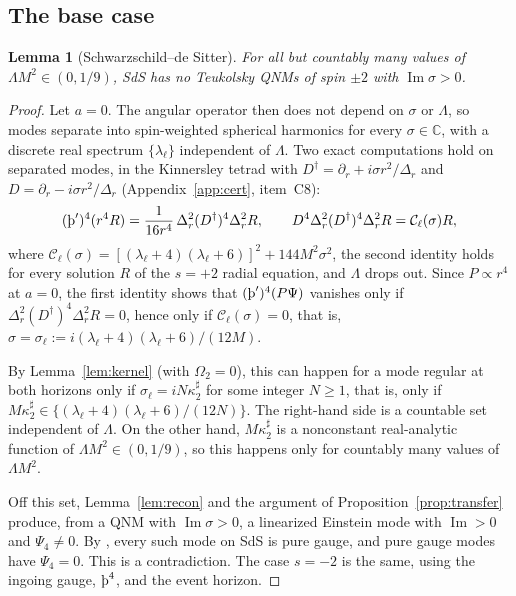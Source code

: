 \documentclass[11pt]{amsart}
\newtheorem{lemma}[theorem]{Lemma}
\theoremstyle{definition}
\theoremstyle{remark}
\numberwithin{equation}{section}
\newcommand{\Th}{\text{\th}}
\newcommand{\C}{\mathbb{C}}
\renewcommand{\Im}{\operatorname{Im}}
\begin{document}
\subsection{The base case}
\begin{lemma}[Schwarzschild--de Sitter]\label{lem:sds}
For all but countably many values of $\Lambda M^2\in(0,1/9)$, SdS has no Teukolsky QNMs of spin $\pm2$ with
$\Im\sigma>0$.
\end{lemma}

\begin{proof}
Let $a=0$. The angular operator then does not depend on $\sigma$ or $\Lambda$, so modes separate into spin-weighted
spherical harmonics for every $\sigma\in\C$, with a discrete real spectrum $\{\lambda_\ell\}$ independent of $\Lambda$. Two
exact computations hold on separated modes, in the Kinnersley tetrad with $D^\dagger=\partial_r+i\sigma r^2/\Delta_r$
and $D=\partial_r-i\sigma r^2/\Delta_r$ (Appendix~\ref{app:cert}, item~C8):
\begin{equation}\label{eq:sdsTS}
(\Th')^4(r^4R)=\frac{1}{16r^4}\,\Delta_r^2(D^\dagger)^4\Delta_r^2R,\qquad
D^4\Delta_r^2(D^\dagger)^4\Delta_r^2R=\mathcal C_\ell(\sigma)R,
\end{equation}
where $\mathcal C_\ell(\sigma)=[(\lambda_\ell+4)(\lambda_\ell+6)]^2+144M^2\sigma^2$, the second identity holds for every solution
$R$ of the $s=+2$ radial equation, and $\Lambda$ drops out. Since $P\propto r^4$ at $a=0$, the first identity shows
that $(\Th')^4(P\Psi)$ vanishes only if $\Delta_r^2(D^\dagger)^4\Delta_r^2R=0$, hence only if $\mathcal C_\ell(\sigma)=0$, that is,
$\sigma=\sigma_\ell:=i(\lambda_\ell+4)(\lambda_\ell+6)/(12M)$.

By Lemma~\ref{lem:kernel} (with $\Omega_2=0$), this can happen for a mode regular at both horizons only if
$\sigma_\ell=iN\kappa_2^\sharp$ for some integer $N\ge1$, that is, only if $M\kappa_2^\sharp\in\{(\lambda_\ell+4)(\lambda_\ell+6)/(12N)\}$.
The right-hand side is a countable set independent of $\Lambda$. On the other hand, $M\kappa_2^\sharp$ is a nonconstant real-analytic function of
$\Lambda M^2\in(0,1/9)$, so this happens only for countably many values of $\Lambda M^2$.

Off this set, Lemma~\ref{lem:recon} and the argument of Proposition~\ref{prop:transfer} produce, from a QNM with
$\Im\sigma>0$, a linearized Einstein mode with $\Im>0$ and $\Psi_4\ne0$. By \cite[\S7]{HV18}, every such mode on SdS
is pure gauge, and pure gauge modes have $\Psi_4=0$. This is a contradiction. The case $s=-2$ is the same, using the
ingoing gauge, $\Th^4$, and the event horizon.
\end{proof}
\end{document}
